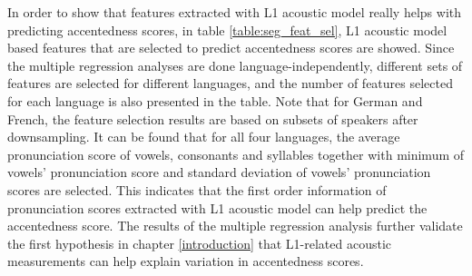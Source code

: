 In order to show that features extracted with L1 acoustic model really helps with predicting accentedness scores, in table \ref{table:seg_feat_sel}, L1 acoustic model based features that are selected to predict accentedness scores are showed. Since the multiple regression analyses are done language-independently, different sets of features are selected for different languages, and the number of features selected for each language is also presented in the table. Note that for German and French, the feature selection results are based on subsets of speakers after downsampling. It can be found that for all four languages, the average pronunciation score of vowels, consonants and syllables together with minimum of vowels' pronunciation score and standard deviation of vowels' pronunciation scores are selected. This indicates that the first order information of pronunciation scores extracted with L1 acoustic model can help predict the accentedness score. The results of the multiple regression analysis further validate the first hypothesis in chapter \ref{introduction} that L1-related acoustic measurements can help explain variation in accentedness scores.

